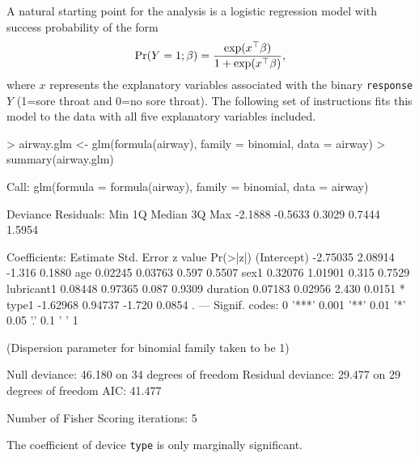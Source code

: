 \documentclass[a4paper,11pt]{article}
\def\code{\texttt}
\begin{document}
A natural starting point for the analysis is a logistic regression model with success probability of the form
%
\[
{\rm Pr}(Y=1;\beta) = \frac{\exp(x^\top\beta)}{1+\exp(x^\top\beta)},
\]
%
where $x$ represents the explanatory variables associated with the binary \code{response} $Y$ (1=sore throat and 0=no sore throat).  The following set of instructions fits this model to the data with all five explanatory variables included.  
%
\begin{Schunk}
\begin{Sinput}
> airway.glm <- glm(formula(airway), family = binomial, data = airway)
> summary(airway.glm)
\end{Sinput}
\begin{Soutput}
Call:
glm(formula = formula(airway), family = binomial, data = airway)

Deviance Residuals: 
    Min       1Q   Median       3Q      Max  
-2.1888  -0.5633   0.3029   0.7444   1.5954  

Coefficients:
            Estimate Std. Error z value Pr(>|z|)  
(Intercept) -2.75035    2.08914  -1.316   0.1880  
age          0.02245    0.03763   0.597   0.5507  
sex1         0.32076    1.01901   0.315   0.7529  
lubricant1   0.08448    0.97365   0.087   0.9309  
duration     0.07183    0.02956   2.430   0.0151 *
type1       -1.62968    0.94737  -1.720   0.0854 .
---
Signif. codes:  0 '***' 0.001 '**' 0.01 '*' 0.05 '.' 0.1 ' ' 1 

(Dispersion parameter for binomial family taken to be 1)

    Null deviance: 46.180  on 34  degrees of freedom
Residual deviance: 29.477  on 29  degrees of freedom
AIC: 41.477

Number of Fisher Scoring iterations: 5
\end{Soutput}
\end{Schunk}
%
The coefficient of device \code{type} is only marginally significant.  
\end{document}
